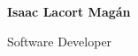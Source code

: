 \documentclass{article}
\begin{document}
\thispagestyle{empty} 
\begin{minipage}{0.4\linewidth}
\textbf{\huge{Isaac Lacort Magán}}
\vspace{0.2cm}

\large{\color{BlueViolet}Software Developer}
\end{minipage}
\hspace{1cm}
\begin{minipage}{0.5\linewidth}
\end{minipage}
\vspace{1.25cm}

\end{document}
